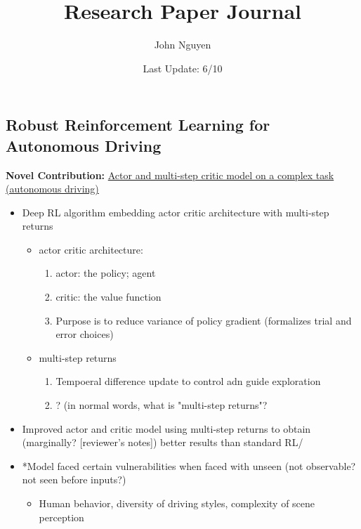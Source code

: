 \documentclass{article}
\begin{document}
\title{Research Paper Journal}
\author{John Nguyen}
\date{Last Update: 6/10}
\maketitle

\subsection*{Robust Reinforcement Learning for Autonomous Driving} 

\textbf{Novel Contribution:} \underline{Actor and multi-step critic model on a complex task (autonomous driving)}


\begin{itemize}
	\item Deep RL algorithm embedding actor critic architecture with multi-step returns
	
	\begin{itemize}
		\item actor critic architecture:
		\begin{enumerate}
			\item actor: the policy; agent
			\item critic: the value function
			\item Purpose is to reduce variance of policy gradient (formalizes trial and error choices)
		\end{enumerate}
		
		\item multi-step returns
		
		\begin{enumerate}
			\item Tempoeral difference update to control adn guide exploration
			\item ? (in normal words, what is "multi-step returns"?
		\end{enumerate}
		
	\end{itemize}	
	
	\item Improved actor and critic model using multi-step returns to obtain (marginally? [reviewer's notes]) better results than standard RL/
	
	\item *Model faced certain vulnerabilities when faced with unseen (not observable? not seen before inputs?)
	
	\begin{itemize}
		\item Human behavior, diversity of driving styles, complexity of scene perception
	\end{itemize}
	

\end{itemize}
\end{document}
